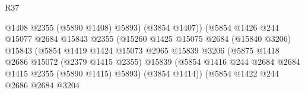 \begin{lexlean}{R37}
\begin{coremodule}
                                              @1408
                                              @2355
                                              (@5890 @1408)
                                              @5893)
                                            (@3854 @1407))
                                          (@5854
                                            @1426
                                            @244
                                            @15077
                                            @2684
                                            @15843
                                            @2355
                                            (@15260
                                              @1425
                                              @15075
                                              @2684
                                              (@15840 @3206)
                                              @15843
                                              (@5854
                                                @1419
                                                @1424
                                                @15073
                                                @2965
                                                @15839
                                                @3206
                                                (@5875
                                                  @1418
                                                  @2686
                                                  @15072
                                                  (@2379 @1415 @2355)
                                                  @15839
                                                  (@5854
                                                    @1416
                                                    @244
                                                    @2684
                                                    @2684
                                                    @1415
                                                    @2355
                                                    (@5890 @1415)
                                                    @5893)
                                                  (@3854 @1414))
                                                (@5854
                                                  @1422
                                                  @244
                                                  @2686
                                                  @2684
                                                  @3204

\end{coremodule}
\end{lexlean}
